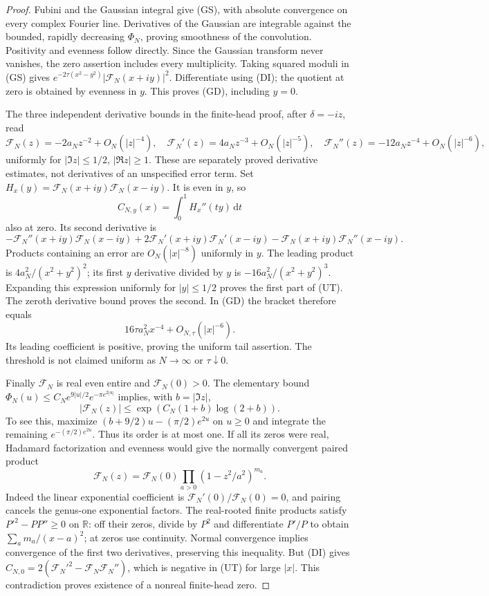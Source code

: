 \documentclass[11pt]{article}
\theoremstyle{remark}\newtheorem{remark}[theorem]{Remark}
\newcommand{\R}{\mathbb R}
\newcommand{\dd}{\,\mathrm d}
\begin{document}
\begin{proof}
Fubini and the Gaussian integral give (GS), with absolute convergence
on every complex Fourier line. Derivatives of the Gaussian are
integrable against the bounded, rapidly decreasing $\Phi_N$, proving
smoothness of the convolution. Positivity and evenness follow directly.
Since the Gaussian transform never vanishes, the zero assertion
includes every multiplicity. Taking squared moduli in (GS) gives
$e^{-2\tau(x^2-y^2)}|\mathcal F_N(x+iy)|^2$.
Differentiate using (DI); the quotient at zero is obtained by evenness
in $y$. This proves (GD), including $y=0$.

The three independent derivative bounds in the finite-head proof,
after $\delta=-iz$, read
\[
 \mathcal F_N(z)=-2a_Nz^{-2}+O_N(|z|^{-4}),\quad
 \mathcal F_N'(z)=4a_Nz^{-3}+O_N(|z|^{-5}),\quad
 \mathcal F_N''(z)=-12a_Nz^{-4}+O_N(|z|^{-6}),
\]
uniformly for $|\Im z|\le1/2$, $|\Re z|\ge1$.
These are separately proved derivative estimates, not derivatives
of an unspecified error term. Set
$H_x(y)=\mathcal F_N(x+iy)\mathcal F_N(x-iy)$.
It is even in $y$, so
\[
 C_{N,y}(x)=\int_0^1H_x''(ty)\dd t
\]
also at zero. Its second derivative is
\[
 -\mathcal F_N''(x+iy)\mathcal F_N(x-iy)
 +2\mathcal F_N'(x+iy)\mathcal F_N'(x-iy)
 -\mathcal F_N(x+iy)\mathcal F_N''(x-iy).
\]
Products containing an error are $O_N(|x|^{-8})$ uniformly in $y$.
The leading product is $4a_N^2/(x^2+y^2)^2$; its first
$y$ derivative divided by $y$ is $-16a_N^2/(x^2+y^2)^3$.
Expanding this expression uniformly for $|y|\le1/2$ proves the
first part of (UT). The zeroth derivative bound proves the second.
In (GD) the bracket therefore equals
\[
 16\tau a_N^2x^{-4}+O_{N,\tau}(|x|^{-6}).
\]
Its leading coefficient is positive, proving the uniform tail assertion.
The threshold is not claimed uniform as $N\to\infty$ or $\tau\downarrow0$.

Finally $\mathcal F_N$ is real even entire and $\mathcal F_N(0)>0$.
The elementary bound $\Phi_N(u)\le C_Ne^{9|u|/2}e^{-\pi e^{2|u|}}$
implies, with $b=|\Im z|$,
\[
 |\mathcal F_N(z)|\le \exp(C_N(1+b)\log(2+b)).
\]
To see this, maximize $(b+9/2)u-(\pi/2)e^{2u}$ on $u\ge0$
and integrate the remaining $e^{-(\pi/2)e^{2u}}$.
Thus its order is at most one. If all its zeros were real,
Hadamard factorization \cite[Theorem 7.7, printed p.~58]{Petrow}
and evenness would give the normally convergent paired product
\[
 \mathcal F_N(z)=\mathcal F_N(0)
                     \prod_{a>0}(1-z^2/a^2)^{m_a}.
\]
Indeed the linear exponential coefficient is
$\mathcal F_N'(0)/\mathcal F_N(0)=0$, and pairing cancels
the genus-one exponential factors. The real-rooted finite products
satisfy $P'^2-PP''\ge0$ on $\R$: off their zeros, divide by $P^2$
and differentiate $P'/P$ to obtain $\sum_a m_a/(x-a)^2$;
at zeros use continuity. Normal convergence implies convergence
of the first two derivatives, preserving this inequality.
But (DI) gives $C_{N,0}=2(\mathcal F_N'^2-\mathcal F_N\mathcal F_N'')$,
which is negative in (UT) for large $|x|$. This contradiction
proves existence of a nonreal finite-head zero.
\end{proof}
\end{document}
